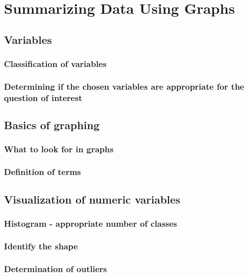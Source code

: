 \chapter{Summarizing Data Using Graphs}  %

\section{Variables}  %
\subsection{Classification of variables}  %
\subsection{Determining if the chosen variables are appropriate for the question of interest}  %

\section{Basics of graphing}  %
\subsection{What to look for in graphs}  %
\subsection{Definition of terms}  %


\section{Visualization of numeric variables}  %
\subsection{Histogram - appropriate number of classes}  %
\subsection{Identify the shape}  %
\subsection{Determination of outliers}  %